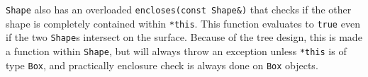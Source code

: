 \lstinline|Shape| also has an overloaded \lstinline|encloses(const Shape&)| that checks if the other shape is completely contained within \lstinline|*this|. This function evaluates to \lstinline|true| even if
the two \lstinline|Shape|s intersect on the surface. Because of the tree design, this is made a function within \lstinline|Shape|, but will always throw an exception unless \lstinline|*this| is of type
\lstinline|Box|, and practically enclosure check is always done on \lstinline|Box| objects.